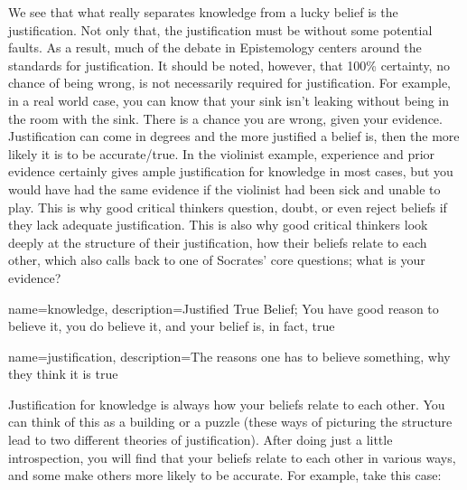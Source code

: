 We see that what really separates knowledge from a lucky belief is the justification. Not only that, the justification must be without some potential faults. As a result, much of the debate in Epistemology centers around the standards for justification. It should be noted, however, that 100\% certainty, no chance of being wrong, is not necessarily required for justification. For example, in a real world case, you can know that your sink isn't leaking without being in the room with the sink. There is a chance you are wrong, given your evidence. Justification can come in degrees and the more justified a belief is, then the more likely it is to be accurate/true. In the violinist example, experience and prior evidence certainly gives ample justification for knowledge in most cases, but you would have had the same evidence if the violinist had been sick and unable to play. This is why good critical thinkers question, doubt, or even reject beliefs if they lack adequate justification. This is also why good critical thinkers look deeply at the structure of their justification, how their beliefs relate to each other, which also calls back to one of Socrates' core questions; what is your evidence?



{
name=knowledge,
description={Justified True Belief; You have good reason to believe it, you do believe it, and your belief is, in fact, true}
}


{
name=justification,
description={The reasons one has to believe something, why they think it is true}
}

Justification for knowledge is always how your beliefs relate to each other. You can think of this as a building or a puzzle (these ways of picturing the structure lead to two different theories of justification). After doing just a little introspection, you will find that your beliefs relate to each other in various ways, and some make others more likely to be accurate. For example, take this case:


